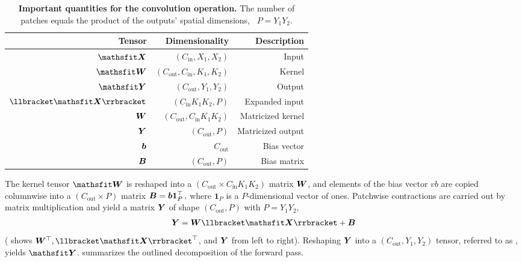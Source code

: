 \begin{table}[t]
  \centering
  \caption{\textbf{Important quantities for the convolution operation.} The
    number of patches equals the product of the outputs' spatial dimensions,
    \ie~$P = Y_1 Y_2$.}
  \label{hbp::table:convolution Quantities}
  \begin{footnotesize}
    \begin{tabular}{rrr}
      \toprule
      Tensor     & Dimensionality     & Description \\
      \midrule
      $\tX$ & $(C_\text{in}, X_1, X_2)$ & Input \\
      $\tW$ & $(C_\text{out}, C_\text{in}, K_1, K_2)$ & Kernel\\
      $\tY$ & $(C_\text{out}, Y_1, Y_2)$ & Output \\
      $\llbracket \tX \rrbracket$ & $(C_\text{in} K_1 K_2, P)$ & Expanded input\\
      ${\bm{W}}$ & $(C_\text{out}, C_\text{in} K_1 K_2)$ & Matricized kernel\\
      ${\bm{Y}}$ & $(C_\text{out}, P)$ & Matricized output\\
      ${\bm{b}}$ & $C_\text{out}$ & Bias vector\\
      ${\bm{B}}$ & $(C_\text{out}, P)$ & Bias matrix\\
      \bottomrule
    \end{tabular}
  \end{footnotesize}
\end{table}

The kernel tensor $\tW$ is reshaped into a $(C_\text{out} \times C_\text{in} K_1
K_2)$ matrix ${\bm{W}}$, and elements of the bias vector $vb$ are copied columnwise
into a $(C_\text{out} \times P)$ matrix
\begin{math}
  {\bm{B}} = {\bm{b}} {\mathbf{1}}^\top_P\,,
\end{math}
where ${\mathbf{1}}_P$ is a $P$-dimensional vector of ones. Patchwise
contractions are carried out by matrix multiplication and yield a matrix ${\bm{Y}}$
of shape $(C_\text{out}, P)$ with $P = Y_1 Y_2$,
\begin{align}
  \label{hbp::eq:convolutionMatrixMultiplication}
  \mY = \mW \llbracket \tX\rrbracket + \mB
\end{align}
( shows $\mW^\top, \llbracket \tX
\rrbracket^\top$, and ${\bm{Y}}$ from left to right). Reshaping ${\bm{Y}}$ into a
$(C_\text{out}, Y_1, Y_2)$ tensor, referred to as , yields
$\tY$.  summarizes the outlined
decomposition of the forward pass.


